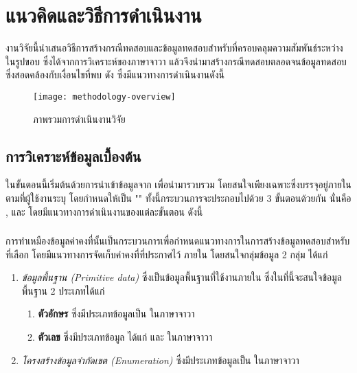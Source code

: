 \section{แนวคิดและวิธีการดำเนินงาน}
\label{sec:methodology}

งานวิจัยนี้นำเสนอวิธีการสร้างกรณีทดสอบและข้อมูลทดสอบสำหรับ{\TestPath}ที่ครอบคลุมความสัมพันธ์ระหว่าง{\softwareComponent}ในรูปขอบ{\scg} 
ซึ่งได้จากการวิเคราะห์{\StaticInformation}ของ{\sourcecode}ภาษาจาวา แล้วจึงนำมาสร้างกรณีทดสอบตลอดจนข้อมูลทดสอบซึ่งสอดคล้องกับเงื่อนไขที่พบ
ดัง ซึ่งมีแนวทางการดำเนินงานดังนี้

\begin{sidewaysfigure}
    \centering
    \texttt{[image: methodology-overview]}
    \caption{ภาพรวมการดำเนินงานวิจัย}
    \label{fig:methodologyoverview}
\end{sidewaysfigure}

\subsection{การวิเคราะห์ข้อมูลเบื้องต้น}
\label{subs:introsection}

ในขั้นตอนนี้เริ่มต้นด้วยการนำเข้าข้อมูล{\sourcecode}จาก{\Repository} เพื่อนำมารวบรวม{\StaticInformation} 
โดยสนใจเพียงเฉพาะ{\class}ซึ่งบรรจุอยู่ภายใน\FirstTimeDefine{\Package}{\PackageEN} ตามที่ผู้ใช้งานระบุ 
โดยกำหนดให้เป็น "\FirstTimeDefine{\CUT}{\CUTEN}" ทั้งนี้กระบวนการจะประกอบไปด้วย 3 ขั้นตอนด้วยกัน นั่นคือ
\FirstTimeDefine{\constantExtracting}, \FirstTimeDefine{\graphCreation}{\graphCreationEN} 
และ\FirstTimeDefine{\sourcecodeInstrumention}{\sourcecodeInstrumentionEN} 
โดยมีแนวทางการดำเนินงานของแต่ละขั้นตอน ดังนี้

\subsubsection{\constantExtracting}
\label{sec:sub:sub:sourceCodeExtract}

การทำเหมืองข้อมูลค่าคงที่นั้นเป็นกระบวนการเพื่อกำหนดแนวทางการในการสร้างข้อมูลทดสอบสำหรับ{\TestPath}ที่เลือก โดยมีแนวทางการจัดเก็บค่าคงที่ที่ประกาศไว้
ภายใน{\sourcecode} โดยสนใจกลุ่มข้อมูล 2 กลุ่ม ได้แก่

\begin{enumerate}
    \item {\it ข้อมูลพื้นฐาน (Primitive data)} ซึ่งเป็นข้อมูลพื้นฐานที่ใช้งานภายใน{\class} ซึ่งในที่นี้จะสนใจข้อมูลพื้นฐาน 2 ประเภทได้แก่
        \begin{enumerate}
            \item {\bf ตัวอักษร} ซึ่งมีประเภทข้อมูลเป็น  ในภาษาจาวา
            \item {\bf ตัวเลข} ซึ่งมีประเภทข้อมูล ได้แก่  และ ในภาษาจาวา
        \end{enumerate}
    \item {\it โครงสร้างข้อมูลจำกัดเขต (Enumeration)} ซึ่งมีประเภทข้อมูลเป็น  ในภาษาจาวา
\end{enumerate}

